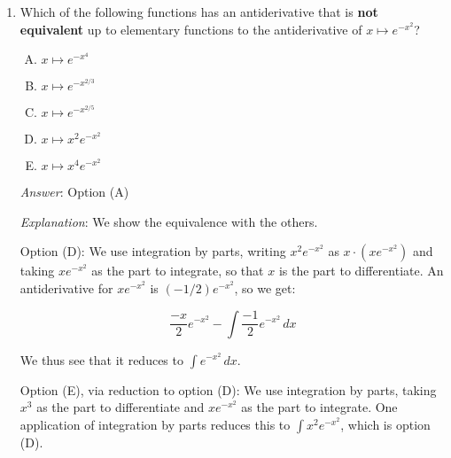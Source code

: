 \documentclass[10pt]{amsart}
\begin{document}
\begin{enumerate}
  {\em Answer}: Option (E)

  {\em Explanation}: We show the equivalence of all the others:

  (A) and (C): Starting with $\int e^{e^x} \, dx$, put $u = e^x$, to
  get $\int e^u/u \, du$. Note that the domain of definition transforms
  correctly.

  (C) and (D): Starting with $\int e^x/x \, dx$, put $u = e^x$, to get
  $du/(\ln u)$. Note that the domain of definition transforms
  correctly.

  (B) and (D): Start with $\int \ln(\ln x) \, dx$. Use integration by
  parts taking $1$ as the part to integrate. We get $x\ln(\ln x) -
  \int \frac{1}{\ln x} \, dx$, establishing the equivalence.

  {\em Performance review}: $7$ out of $11$ got this, $4$ chose (B).

  {\em Historical note}: $7$ out of $27$ people got this
  correct. $14$ people chose (C), $3$ people chose (B), $2$ people
  chose (D), $1$ person chose (A).

\item Which of the following functions has an antiderivative that is
  {\bf not equivalent} up to elementary functions to the
  antiderivative of $x \mapsto e^{-x^2}$?

  \begin{enumerate}[(A)]
  \item $x \mapsto e^{-x^4}$
  \item $x \mapsto e^{-x^{2/3}}$
  \item $x \mapsto e^{-x^{2/5}}$
  \item $x \mapsto x^2e^{-x^2}$
  \item $x \mapsto x^4e^{-x^2}$
  \end{enumerate}

  {\em Answer}: Option (A)

  {\em Explanation}: We show the equivalence with the others.

  Option (D): We use integration by parts, writing
  $x^2e^{-x^2}$ as $x \cdot (xe^{-x^2})$ and taking $xe^{-x^2}$ as the
  part to integrate, so that $x$ is the part to differentiate. An
  antiderivative for $xe^{-x^2}$ is $(-1/2)e^{-x^2}$, so we get:

  $$\frac{-x}{2}e^{-x^2} - \int \frac{-1}{2}e^{-x^2} \, dx$$

  We thus see that it reduces to $\int e^{-x^2} \, dx$.

  Option (E), via reduction to option (D): We use integration by
  parts, taking $x^3$ as the part to differentiate and $xe^{-x^2}$ as
  the part to integrate. One application of integration by parts
  reduces this to $\int x^2e^{-x^2}$, which is option (D).


\end{enumerate}
\end{document}
